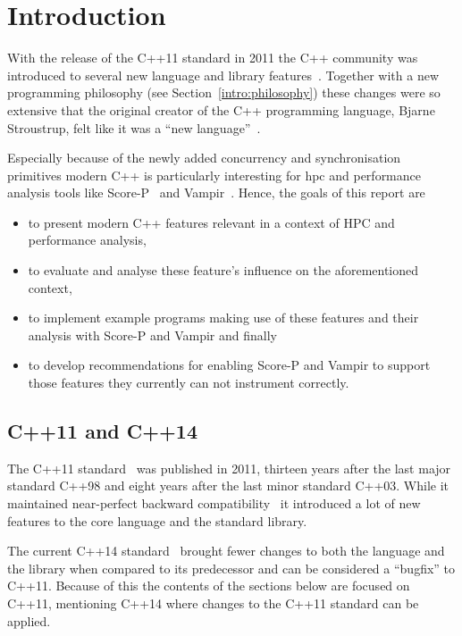 \section{Introduction}\label{intro}

With the release of the C++11 standard in 2011 the C++ community was introduced to several new language and library features~\cite{cpp11std}. Together with a new programming philosophy (see Section~\ref{intro:philosophy}) these changes were so extensive that the original creator of the C++ programming language, Bjarne Stroustrup, felt like it was a ``new language''~\cite{tcpp}.

Especially because of the newly added concurrency and synchronisation primitives modern C++ is particularly interesting for \gls{hpc} and performance analysis tools like Score-P~\cite{scorep} and Vampir~\cite{vampir}. Hence, the goals of this report are
\begin{itemize}
\item to present modern C++ features relevant in a context of HPC and performance analysis,
\item to evaluate and analyse these feature's influence on the aforementioned context,
\item to implement example programs making use of these features and their analysis with Score-P and Vampir and finally
\item to develop recommendations for enabling Score-P and Vampir to support those features they currently can not instrument correctly.
\end{itemize}

\subsection{C++11 and C++14}\label{intro:cpp11_14}

The C++11 standard~\cite{cpp11std} was published in 2011, thirteen years after the last major standard C++98 and eight years after the last minor standard C++03. While it maintained near-perfect backward compatibility~\cite{cppfaq_learn} it introduced a lot of new features to the core language and the standard library.

The current C++14 standard~\cite{cpp14std} brought fewer changes to both the language and the library when compared to its predecessor and can be considered a ``bugfix'' to C++11. Because of this the contents of the sections below are focused on C++11, mentioning C++14 where changes to the C++11 standard can be applied.

